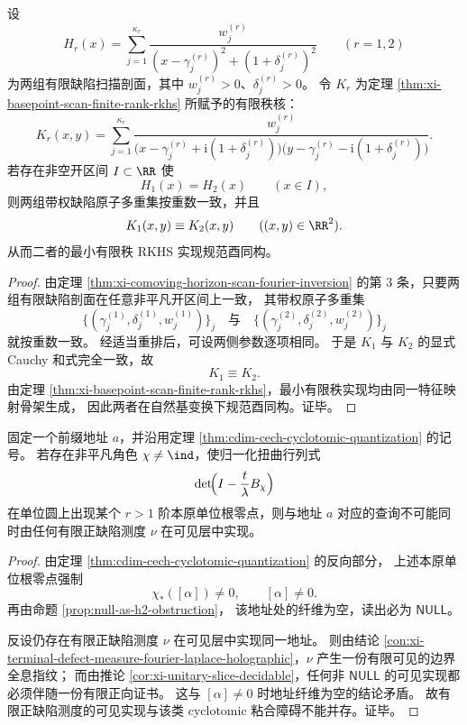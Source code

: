 \begin{theorem}[对角全息的核刚性]\label{thm:xi-diagonal-holography-kernel-rigidity}
设
\[
H_r(x)=\sum_{j=1}^{\kappa_r}
\frac{w_j^{(r)}}{(x-\gamma_j^{(r)})^2+(1+\delta_j^{(r)})^2}
\qquad (r=1,2)
\]
为两组有限缺陷扫描剖面，其中 \(w_j^{(r)}>0\)、\(\delta_j^{(r)}>0\)。
令 \(K_r\) 为定理 \ref{thm:xi-basepoint-scan-finite-rank-rkhs} 所赋予的有限秩核：
\[
K_r(x,y)=
\sum_{j=1}^{\kappa_r}
\frac{w_j^{(r)}}{
\bigl(x-\gamma_j^{(r)}+\mathrm{i}(1+\delta_j^{(r)})\bigr)
\bigl(y-\gamma_j^{(r)}-\mathrm{i}(1+\delta_j^{(r)})\bigr)}.
\]
若存在非空开区间 \(I\subset\RR\) 使
\[
H_1(x)=H_2(x)
\qquad(x\in I),
\]
则两组带权缺陷原子多重集按重数一致，并且
\[
K_1(x,y)\equiv K_2(x,y)
\qquad((x,y)\in\RR^2).
\]
从而二者的最小有限秩 RKHS 实现规范酉同构。
\end{theorem}
\begin{proof}
由定理 \ref{thm:xi-comoving-horizon-scan-fourier-inversion} 的第 \(3\) 条，只要两组有限缺陷剖面在任意非平凡开区间上一致，
其带权原子多重集
\[
\{(\gamma_j^{(1)},\delta_j^{(1)},w_j^{(1)})\}_{j}
\quad\text{与}\quad
\{(\gamma_j^{(2)},\delta_j^{(2)},w_j^{(2)})\}_{j}
\]
就按重数一致。
经适当重排后，可设两侧参数逐项相同。
于是 \(K_1\) 与 \(K_2\) 的显式 Cauchy 和式完全一致，故
\[
K_1\equiv K_2.
\]
由定理 \ref{thm:xi-basepoint-scan-finite-rank-rkhs}，最小有限秩实现均由同一特征映射骨架生成，
因此两者在自然基变换下规范酉同构。证毕。
\end{proof}

\begin{theorem}\label{thm:xi-holography-cech-mutual-exclusion}
固定一个前缀地址 \(a\)，并沿用定理 \ref{thm:cdim-cech-cyclotomic-quantization} 的记号。
若存在非平凡角色 \(\chi\neq \ind\)，使归一化扭曲行列式
\[
\det\!\Bigl(I-\frac{t}{\lambda}B_\chi\Bigr)
\]
在单位圆上出现某个 \(r>1\) 阶本原单位根零点，则与地址 \(a\) 对应的查询不可能同时由任何有限正缺陷测度
\(\nu\) 在可见层中实现。
\end{theorem}
\begin{proof}
由定理 \ref{thm:cdim-cech-cyclotomic-quantization} 的反向部分，
上述本原单位根零点强制
\[
\chi_*([\alpha])\neq 0,
\qquad
[\alpha]\neq 0.
\]
再由命题 \ref{prop:null-as-h2-obstruction}，
该地址处的纤维为空，读出必为 \(\mathsf{NULL}\)。

反设仍存在有限正缺陷测度 \(\nu\) 在可见层中实现同一地址。
则由结论 \ref{con:xi-terminal-defect-measure-fourier-laplace-holographic}，\(\nu\) 产生一份有限可见的边界全息指纹；
而由推论 \ref{cor:xi-unitary-slice-decidable}，任何非 \(\mathsf{NULL}\) 的可见实现都必须伴随一份有限正向证书。
这与 \([\alpha]\neq 0\) 时地址纤维为空的结论矛盾。
故有限正缺陷测度的可见实现与该类 cyclotomic 粘合障碍不能并存。证毕。
\end{proof}

